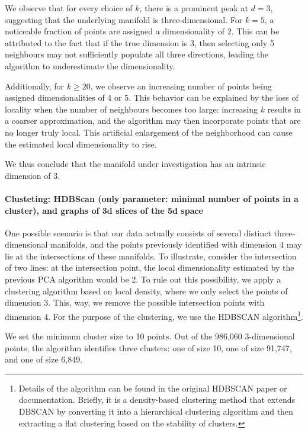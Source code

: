 \documentclass[11pt]{article}
\begin{document}
		We observe that for every choice of $k$, there is a prominent peak at $d = 3$, suggesting that the underlying manifold is three-dimensional. For $k = 5$, a noticeable fraction of points are assigned a dimensionality of 2. This can be attributed to the fact that if the true dimension is 3, then selecting only 5 neighbours may not sufficiently populate all three directions, leading the algorithm to underestimate the dimensionality.
		
		Additionally, for $k \geq 20$, we observe an increasing number of points being assigned dimensionalities of 4 or 5. This behavior can be explained by the loss of locality when the number of neighbours becomes too large: increasing $k$ results in a coarser approximation, and the algorithm may then incorporate points that are no longer truly local. This artificial enlargement of the neighborhood can cause the estimated local dimensionality to rise.
		
		We thus conclude that the manifold under investigation has an intrinsic dimension of 3.
		
		\paragraph{Clusteting: HDBScan (only parameter: minimal number of points in a cluster), and graphs of 3d slices of the 5d space}
		
		One possible scenario is that our data actually consists of several distinct three-dimensional manifolds, and the points previously identified with dimension $4$ may lie at the intersections of these manifolds. To illustrate, consider the intersection of two lines: at the intersection point, the local dimensionality estimated by the previous PCA algorithm would be 2. To rule out this possibility, we apply a clustering algorithm based on local density, where we only select the points of dimension 3. This, way, we remove the possible intersection points with dimension 4. For the purpose of the clustering, we use the HDBSCAN algorithm\footnote{Details of the algorithm can be found in the original HDBSCAN paper or documentation. Briefly, it is a density-based clustering method that extends DBSCAN by converting it into a hierarchical clustering algorithm and then extracting a flat clustering based on the stability of clusters.}.
		
		We set the minimum cluster size to 10 points. Out of the 986,060 3-dimensional points, the algorithm identifies three clusters: one of size 10, one of size 91,747, and one of size 6,849.
		
\end{document}
